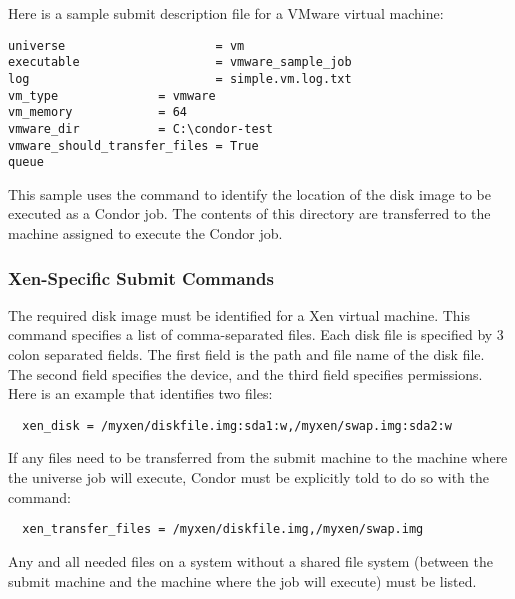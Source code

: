 Here is a sample submit description file for a VMware virtual machine:
\begin{verbatim}
universe                     = vm
executable                   = vmware_sample_job
log                          = simple.vm.log.txt
vm_type			     = vmware
vm_memory		     = 64
vmware_dir		     = C:\condor-test
vmware_should_transfer_files = True
queue
\end{verbatim}
This sample uses the  command to identify
the location of the disk image to be executed as a Condor job.
The contents of this directory are transferred to the machine assigned
to execute the Condor job.

\subsubsection{\label{sec:vm-Xensubmitfile}Xen-Specific Submit Commands}

The required disk image must be identified for a Xen virtual machine.
This  command specifies a list of comma-separated files.
Each disk file is specified by 3 colon separated fields.
The first field is the path and file name of the disk file.
The second field specifies the device,
and the third field specifies permissions.
Here is an example that identifies two files:
\footnotesize
\begin{verbatim}
  xen_disk = /myxen/diskfile.img:sda1:w,/myxen/swap.img:sda2:w
\end{verbatim}
\normalsize

If any files need to be transferred from the submit machine
to the machine where the  universe job will execute, 
Condor must be explicitly told to do so with the 
 command:
\footnotesize
\begin{verbatim}
  xen_transfer_files = /myxen/diskfile.img,/myxen/swap.img
\end{verbatim}
\normalsize
Any and all needed files on a system without a shared file
system (between the submit machine and the machine where the
job will execute) must be listed.

